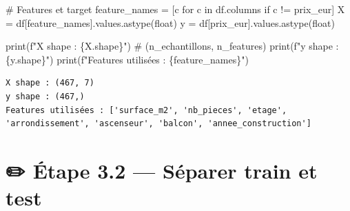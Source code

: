 \documentclass[
  french,
  11pt,
  a4paper,
]{scrbook}
\newenvironment{Shaded}{}{}
\newcommand{\BuiltInTok}[1]{\textcolor[rgb]{0.84,0.23,0.29}{#1}}
\newcommand{\CommentTok}[1]{\textcolor[rgb]{0.42,0.45,0.49}{#1}}
\newcommand{\ControlFlowTok}[1]{\textcolor[rgb]{0.84,0.23,0.29}{#1}}
\newcommand{\KeywordTok}[1]{\textcolor[rgb]{0.84,0.23,0.29}{#1}}
\newcommand{\NormalTok}[1]{\textcolor[rgb]{0.14,0.16,0.18}{#1}}
\newcommand{\OperatorTok}[1]{\textcolor[rgb]{0.14,0.16,0.18}{#1}}
\newcommand{\SpecialCharTok}[1]{\textcolor[rgb]{0.00,0.36,0.77}{#1}}
\newcommand{\SpecialStringTok}[1]{\textcolor[rgb]{0.01,0.18,0.38}{#1}}
\newcommand{\StringTok}[1]{\textcolor[rgb]{0.01,0.18,0.38}{#1}}
\begin{document}
\begin{tcolorbox}[enhanced jigsaw, arc=.35mm, bottomrule=.15mm, bottomtitle=1mm, breakable, colback=white, colbacktitle=quarto-callout-tip-color!10!white, colframe=quarto-callout-tip-color-frame, coltitle=black, left=2mm, leftrule=.75mm, opacityback=0, opacitybacktitle=0.6, rightrule=.15mm, title=\textcolor{quarto-callout-tip-color}{\faLightbulb}\hspace{0.5em}{✅ Corrigé Étape 3.1}, titlerule=0mm, toprule=.15mm, toptitle=1mm]

\begin{Shaded}
\begin{Highlighting}[]
\CommentTok{\# Features et target}
\NormalTok{feature\_names }\OperatorTok{=}\NormalTok{ [c }\ControlFlowTok{for}\NormalTok{ c }\KeywordTok{in}\NormalTok{ df.columns }\ControlFlowTok{if}\NormalTok{ c }\OperatorTok{!=} \StringTok{\textquotesingle{}prix\_eur\textquotesingle{}}\NormalTok{]}
\NormalTok{X }\OperatorTok{=}\NormalTok{ df[feature\_names].values.astype(}\BuiltInTok{float}\NormalTok{)}
\NormalTok{y }\OperatorTok{=}\NormalTok{ df[}\StringTok{\textquotesingle{}prix\_eur\textquotesingle{}}\NormalTok{].values.astype(}\BuiltInTok{float}\NormalTok{)}

\BuiltInTok{print}\NormalTok{(}\SpecialStringTok{f"X shape : }\SpecialCharTok{\{}\NormalTok{X}\SpecialCharTok{.}\NormalTok{shape}\SpecialCharTok{\}}\SpecialStringTok{"}\NormalTok{)  }\CommentTok{\# (n\_echantillons, n\_features)}
\BuiltInTok{print}\NormalTok{(}\SpecialStringTok{f"y shape : }\SpecialCharTok{\{}\NormalTok{y}\SpecialCharTok{.}\NormalTok{shape}\SpecialCharTok{\}}\SpecialStringTok{"}\NormalTok{)}
\BuiltInTok{print}\NormalTok{(}\SpecialStringTok{f"Features utilisées : }\SpecialCharTok{\{}\NormalTok{feature\_names}\SpecialCharTok{\}}\SpecialStringTok{"}\NormalTok{)}
\end{Highlighting}
\end{Shaded}

\begin{verbatim}
X shape : (467, 7)
y shape : (467,)
Features utilisées : ['surface_m2', 'nb_pieces', 'etage', 'arrondissement', 'ascenseur', 'balcon', 'annee_construction']
\end{verbatim}

\end{tcolorbox}

\section{✏️ Étape 3.2 --- Séparer train et
test}\label{uxe9tape-3.2-suxe9parer-train-et-test}
\end{document}
